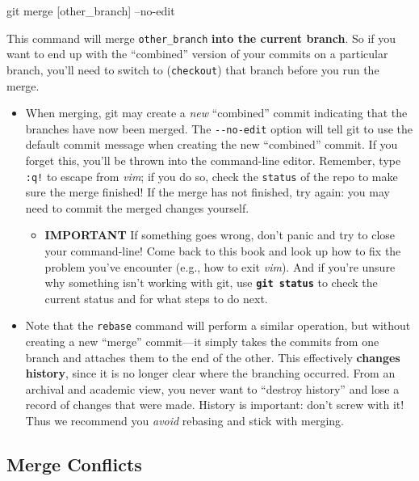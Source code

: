 \documentclass[]{book}
\newenvironment{Shaded}{\begin{snugshade}}{\end{snugshade}}
\newcommand{\FunctionTok}[1]{\textcolor[rgb]{0.00,0.00,0.00}{#1}}
\newcommand{\NormalTok}[1]{#1}
\providecommand{\tightlist}{%
  \setlength{\itemsep}{0pt}\setlength{\parskip}{0pt}}
\theoremstyle{definition}
\theoremstyle{definition}
\theoremstyle{remark}
\begin{document}
\begin{Shaded}
\begin{Highlighting}[]
\FunctionTok{git}\NormalTok{ merge [other_branch] --no-edit}
\end{Highlighting}
\end{Shaded}

This command will merge \texttt{other\_branch} \textbf{into the current
branch}. So if you want to end up with the ``combined'' version of your
commits on a particular branch, you'll need to switch to
(\texttt{checkout}) that branch before you run the merge.

\begin{itemize}
\item
  When merging, git may create a \emph{new} ``combined'' commit
  indicating that the branches have now been merged. The
  \texttt{-\/-no-edit} option will tell git to use the default commit
  message when creating the new ``combined'' commit. If you forget this,
  you'll be thrown into the command-line editor. Remember, type
  \texttt{:q!} to escape from \emph{vim}; if you do so, check the
  \texttt{status} of the repo to make sure the merge finished! If the
  merge has not finished, try again: you may need to commit the merged
  changes yourself.

  \begin{itemize}
  \tightlist
  \item
    \textbf{IMPORTANT} If something goes wrong, don't panic and try to
    close your command-line! Come back to this book and look up how to
    fix the problem you've encounter (e.g., how to exit \emph{vim}). And
    if you're unsure why something isn't working with git, use
    \textbf{\texttt{git\ status}} to check the current status and for
    what steps to do next.
  \end{itemize}
\item
  Note that the \texttt{rebase} command will perform a similar
  operation, but without creating a new ``merge'' commit---it simply
  takes the commits from one branch and attaches them to the end of the
  other. This effectively \textbf{changes history}, since it is no
  longer clear where the branching occurred. From an archival and
  academic view, you never want to ``destroy history'' and lose a record
  of changes that were made. History is important: don't screw with it!
  Thus we recommend you \emph{avoid} rebasing and stick with merging.
\end{itemize}

\subsection{Merge Conflicts}\label{merge-conflicts}
\end{document}

